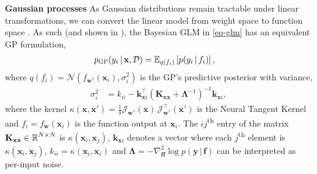 \documentclass{article}
\newcommand{\weights}{\ensuremath{\mathbf{w}}}
\newcommand{\mbf}[1]{\mathbf{#1}}
\renewcommand{\mid}{\,|\,}
\newcommand{\vf}{\mbf{f}}
\newcommand{\vx}{\mbf{x}}
\newcommand{\vy}{\mbf{y}}
\newcommand{\vw}{\mbf{w}}
\newcommand{\Jac}[2]{\mathcal{J}_{#1}(#2)}
\newcommand{\JacT}[2]{\mathcal{J}_{#1}^\top(#2)}
\newcommand{\MKxx}{\mbf{K}_{\mbf{x}\mbf{x}}}
\newcommand{\vk}{\mbf{k}}
\newcommand{\myexpect}{\mathbb{E}}
\begin{document}
\textbf{Gaussian processes}
As Gaussian distributions remain tractable under linear transformations, we can convert the linear model from
weight space to function space \citep[see Ch.~2.1 in ][]{rasmussen2006gaussian}.
As such (and shown in \citet{immer2021improving}), the Bayesian GLM in \cref{eq-glm} has an equivalent GP formulation,
\begin{align} \label{eq-gp-pred-immer}
  p_{\text{\sc GP}}(y_{i} \mid \vx, \mathcal{D}) &= \E_{q(f_{i})} \left[ p(y_{i} \mid f_{i} )\right],
\end{align}
where $q(f_{i}) = \mathcal{N} \left( f_{\vw^{*}}(\vx_{i}), \sigma^{2}_{i} \right)$ is the GP's predictive posterior with variance,
\begin{align} \label{eq-gp-pred-immer-gp}
  \sigma^{2}_{i} &= k_{ii} - \vk_{\vx i}^\top ( \MKxx + \bm\Lambda^{-1})^{-1} \vk_{\vx i},
\end{align}
where the kernel $\kappa(\vx,\vx')=\frac{1}{\delta} \Jac{\weights^*}{\vx} \, \JacT{\weights^*}{\vx'}$ is the Neural Tangent Kernel \citep[NTK,][]{jacot2018neural}
and $f_i = f_\vw(\vx_i)$ is the function output at $\vx_i$.
The $ij$\textsuperscript{th} entry of the matrix $\MKxx \in \R^{N \times N}$ is $\kappa(\vx_i,\vx_j)$, $\vk_{\vx i}$ denotes a vector where
each $j$\textsuperscript{th} element is $\kappa(\vx_i, \vx_j)$, $k_{ii} = \kappa(\vx_i, \vx_i)$ and $\bm\Lambda = - \nabla^2_{\vf \vf}\log p(\vy \mid \vf)$ can be interpreted as per-input noise.
\end{document}
